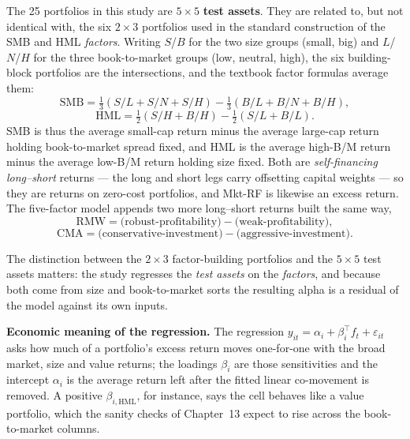 The 25 portfolios in this study are $5\times5$ \textbf{test assets}. They
are related to, but not identical with, the six $2\times3$ portfolios used
in the standard construction of the SMB and HML \emph{factors}. Writing
$S$/$B$ for the two size groups (small, big) and $L$/$N$/$H$ for the three
book-to-market groups (low, neutral, high), the six building-block
portfolios are the intersections, and the textbook factor formulas average
them:
\begin{equation}
\mathrm{SMB} = \tfrac13(S/L + S/N + S/H) - \tfrac13(B/L + B/N + B/H),
\end{equation}
\begin{equation}
\mathrm{HML} = \tfrac12(S/H + B/H) - \tfrac12(S/L + B/L).
\end{equation}
SMB is thus the average small-cap return minus the average large-cap
return holding book-to-market spread fixed, and HML is the average
high-B/M return minus the average low-B/M return holding size fixed. Both
are \emph{self-financing long--short} returns --- the long and short legs
carry offsetting capital weights --- so they are returns on zero-cost
portfolios, and Mkt-RF is likewise an excess return. The five-factor model
appends two more long--short returns built the same way,
\begin{equation}
\mathrm{RMW} = \text{(robust-profitability)} - \text{(weak-profitability)},
\end{equation}
\begin{equation}
\mathrm{CMA} = \text{(conservative-investment)} - \text{(aggressive-investment)}.
\end{equation}

The distinction between the $2\times3$ factor-building portfolios and the
$5\times5$ test assets matters: the study regresses the \emph{test assets}
on the \emph{factors}, and because both come from size and book-to-market
sorts the resulting alpha is a residual of the model against its own
inputs.

\textbf{Economic meaning of the regression.} The regression
$y_{it}=\alpha_i+\beta_i^{\top}f_t+\varepsilon_{it}$ asks how much of a
portfolio's excess return moves one-for-one with the broad market, size
and value returns; the loadings $\beta_i$ are those sensitivities and the
intercept $\alpha_i$ is the average return left after the fitted linear
co-movement is removed. A positive $\beta_{i,\mathrm{HML}}$, for instance,
says the cell behaves like a value portfolio, which the sanity checks of
Chapter~13 expect to rise across the book-to-market columns.

